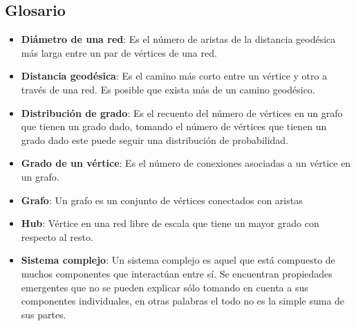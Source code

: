 \subsection{Glosario}
\begin{itemize}
    \item \textbf{Diámetro de una red}\cite{RosenDiscrete}: Es el número de aristas de la distancia geodésica más larga entre un par de vértices de una red.
    \item \textbf{Distancia geodésica}\cite{RosenDiscrete}: Es el camino más corto entre un vértice y otro a través de una red. Es posible que exista más de un camino geodésico.
    \item \textbf{Distribución de grado}\cite{BarabasiNetwork}: Es el recuento del número de vértices en un grafo que tienen un grado dado, tomando el número de vértices que tienen un grado dado este puede seguir una distribución de probabilidad.
    \item \textbf{Grado de un vértice}\cite{RosenDiscrete}: Es el número de conexiones asociadas a un vértice en un grafo.
    \item \textbf{Grafo}: Un grafo es un conjunto de vértices conectados con aristas
    \item \textbf{Hub}\cite{BarabasiNetwork}: Vértice en una red libre de escala que tiene un mayor grado con respecto al resto.
    \item \textbf{Sistema complejo}\cite{BarabasiNetwork}: Un sistema complejo es aquel que está compuesto de muchos componentes que interactúan entre sí. Se encuentran propiedades emergentes que no se pueden explicar sólo tomando en cuenta a sus componentes individuales, en otras palabras el todo no es la simple suma de sus partes.
\end{itemize}

